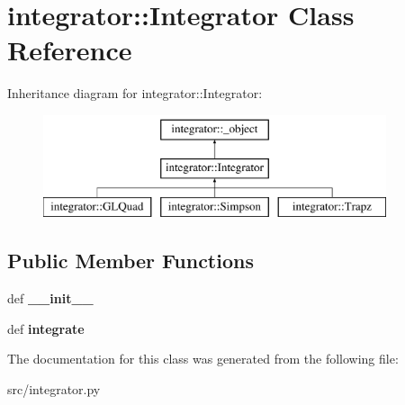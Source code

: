 \hypertarget{classintegrator_1_1Integrator}{
\section{integrator::Integrator Class Reference}
\label{dc/da1/classintegrator_1_1Integrator}
}
Inheritance diagram for integrator::Integrator:\begin{figure}[H]
\begin{center}
\leavevmode
\includegraphics[height=3cm]{dc/da1/classintegrator_1_1Integrator}
\end{center}
\end{figure}
\subsection*{Public Member Functions}
\begin{DoxyCompactItemize}
\item 
\hypertarget{classintegrator_1_1Integrator_a973f474b13cde1d131d4a187b6b9f498}{
def {\bfseries \_\-\_\-init\_\-\_\-}}
\label{dc/da1/classintegrator_1_1Integrator_a973f474b13cde1d131d4a187b6b9f498}

\item 
\hypertarget{classintegrator_1_1Integrator_a7ab4e9c4f500e5c1020508e160237e0e}{
def {\bfseries integrate}}
\label{dc/da1/classintegrator_1_1Integrator_a7ab4e9c4f500e5c1020508e160237e0e}

\end{DoxyCompactItemize}


The documentation for this class was generated from the following file:\begin{DoxyCompactItemize}
\item 
src/integrator.py\end{DoxyCompactItemize}
